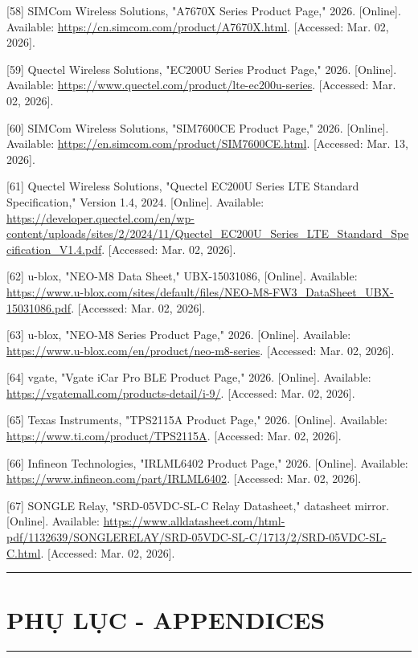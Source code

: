 \documentclass[13pt,a4paper]{extarticle}
\renewcommand{\\}{\thesislongtableorignewline\hline}%
\newcommand{\majorheading}[1]{\clearpage\section*{#1}}
\begin{document}
{[}58{]} SIMCom Wireless Solutions, "A7670X Series Product Page," 2026.
{[}Online{]}. Available:
\url{https://cn.simcom.com/product/A7670X.html}. {[}Accessed: Mar. 02,
2026{]}.

{[}59{]} Quectel Wireless Solutions, "EC200U Series Product Page," 2026.
{[}Online{]}. Available:
\url{https://www.quectel.com/product/lte-ec200u-series}. {[}Accessed:
Mar. 02, 2026{]}.

{[}60{]} SIMCom Wireless Solutions, "SIM7600CE Product Page," 2026.
{[}Online{]}. Available:
\url{https://en.simcom.com/product/SIM7600CE.html}. {[}Accessed: Mar.
13, 2026{]}.

{[}61{]} Quectel Wireless Solutions, "Quectel EC200U Series LTE Standard
Specification," Version 1.4, 2024. {[}Online{]}. Available:
\url{https://developer.quectel.com/en/wp-content/uploads/sites/2/2024/11/Quectel_EC200U_Series_LTE_Standard_Specification_V1.4.pdf}.
{[}Accessed: Mar. 02, 2026{]}.

{[}62{]} u-blox, "NEO-M8 Data Sheet," UBX-15031086, {[}Online{]}.
Available:
\url{https://www.u-blox.com/sites/default/files/NEO-M8-FW3_DataSheet_UBX-15031086.pdf}.
{[}Accessed: Mar. 02, 2026{]}.

{[}63{]} u-blox, "NEO-M8 Series Product Page," 2026. {[}Online{]}.
Available: \url{https://www.u-blox.com/en/product/neo-m8-series}.
{[}Accessed: Mar. 02, 2026{]}.

{[}64{]} vgate, "Vgate iCar Pro BLE Product Page," 2026. {[}Online{]}.
Available: \url{https://vgatemall.com/products-detail/i-9/}.
{[}Accessed: Mar. 02, 2026{]}.

{[}65{]} Texas Instruments, "TPS2115A Product Page," 2026. {[}Online{]}.
Available: \url{https://www.ti.com/product/TPS2115A}. {[}Accessed: Mar.
02, 2026{]}.

{[}66{]} Infineon Technologies, "IRLML6402 Product Page," 2026.
{[}Online{]}. Available: \url{https://www.infineon.com/part/IRLML6402}.
{[}Accessed: Mar. 02, 2026{]}.

{[}67{]} SONGLE Relay, "SRD-05VDC-SL-C Relay Datasheet," datasheet
mirror. {[}Online{]}. Available:
\url{https://www.alldatasheet.com/html-pdf/1132639/SONGLERELAY/SRD-05VDC-SL-C/1713/2/SRD-05VDC-SL-C.html}.
{[}Accessed: Mar. 02, 2026{]}.

\begin{center}\rule{0.5\linewidth}{0.5pt}\end{center}

\majorheading{PHỤ LỤC - APPENDICES}

\begin{center}\rule{0.5\linewidth}{0.5pt}\end{center}
\end{document}
